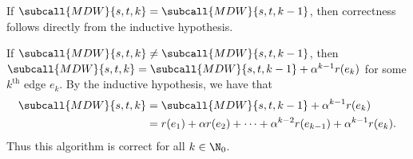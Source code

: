 \documentclass{article}
\begin{document}
\begin{solution}
\begin{subproof}[Correctness.]
 If \( \subcall{MDW}{s,t,k}=\subcall{MDW}{s,t,k-1} \), then correctness follows directly from the inductive hypothesis.

 If \( \subcall{MDW}{s,t,k}\neq \subcall{MDW}{s,t,k-1} \), then \( \subcall{MDW}{s,t,k}=\subcall{MDW}{s,t,k-1}+\alpha^{k-1}r(e_k) \) for some \( k^{\text{th}} \) edge \( e_k \). By the inductive hypothesis, we have that \begin{align*}
\subcall{MDW}{s,t,k}&=\subcall{MDW}{s,t,k-1}+\alpha^{k-1}r(e_k) \\
&= r(e_1) + \alpha r(e_2)+ \cdots + \alpha^{k-2} r(e_{k-1}) +\alpha^{k-1}r(e_k).
\end{align*}
Thus this algorithm is correct for all \( k\in \N_0 \).
\end{subproof}
\end{solution}
\end{document}

